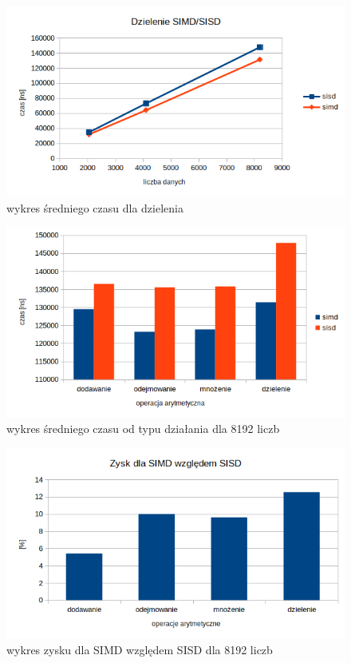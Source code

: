 \documentclass[11pt]{article}
\begin{document}
\begin{figure}[H]
    \includegraphics[width=13cm]{images/dzielenie.png}
    \caption{wykres średniego czasu dla dzielenia}
\end{figure}
\begin{figure}[H]
    \includegraphics[width=13cm]{images/operacje.png}
    \caption{wykres średniego czasu od typu działania dla 8192 liczb}
\end{figure}
\begin{figure}[H]
    \includegraphics[width=13cm]{images/zysk.png}
    \caption{wykres zysku dla SIMD względem SISD dla 8192 liczb}
\end{figure}
\clearpage
\end{document}
